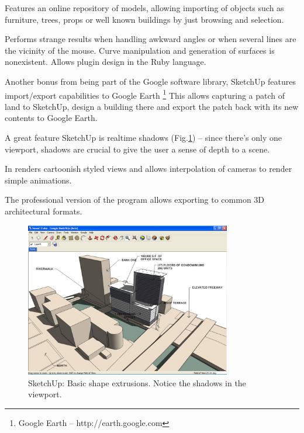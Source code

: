 Features an online repository of models, allowing importing of objects such as
furniture, trees, props or well known buildings by just browsing and selection.

Performs strange results when handling awkward angles or when several lines
are the vicinity of the mouse.
Curve manipulation and generation of surfaces is nonexistent.
Allows plugin design in the Ruby language.

Another bonus from being part of the Google software library, SketchUp features import/export capabilities to Google Earth
\footnote{Google Earth -- http://earth.google.com}%
This allows capturing a patch of land to SketchUp, design a building there and export the patch
back with its new contents to Google Earth.

A great feature SketchUp is realtime shadows (Fig.\ref{FIG-SKETCHUP}) -- since there's only one viewport, shadows are crucial to give the user a sense of depth to a scene.

In renders cartoonish styled views and allows interpolation of cameras to render simple animations.

The professional version of the program allows exporting to common 3D architectural formats.


\begin{figure}[!ht]
    \centering
    \includegraphics[width=9cm]{gfx/sketchup-1.png}
    \caption{SketchUp: Basic shape extrusions. Notice the shadows in the viewport.}
    \label{FIG-SKETCHUP}
\end{figure}

\newpage

